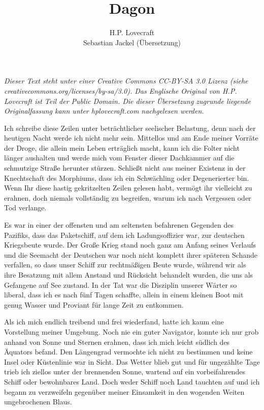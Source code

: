 \documentclass[a4paper]{memoir}
\begin{document}
\title{Dagon}
\author{H.P. Lovecraft\\
		Sebastian Jackel (Übersetzung)}
\date{}
\maketitle

\textit{Dieser Text steht unter einer Creative Commons CC-BY-SA 3.0 Lizenz
(siehe\\ creativecommons.org/licenses/by-sa/3.0). Das Englische Original von H.P. Lovecraft ist Teil der Public Domain. Die dieser Übersetzung zugrunde liegende Originalfassung kann unter hplovecraft.com nachgelesen werden.}

\vspace{12pt}

Ich schreibe diese Zeilen unter beträchtlicher seelischer Belastung, denn nach der heutigen Nacht werde ich nicht mehr sein. Mittellos und am Ende meiner Vorräte der Droge, die allein mein Leben erträglich macht, kann ich die Folter nicht länger aushalten und werde mich vom Fenster dieser Dachkammer auf die schmutzige Straße herunter stürzen. Schließt nicht aus meiner Existenz in der Knechtschaft des Morphiums, dass ich ein Schwächling oder Degenerierter bin. Wenn Ihr diese hastig gekritzelten Zeilen gelesen habt, vermögt ihr vielleicht zu erahnen, doch niemals vollständig zu begreifen, warum ich nach Vergessen oder Tod verlange.

Es war in einer der offensten und am seltensten befahrenen Gegenden des Pazifiks, dass das Paketschiff, auf dem ich Ladungsoffizier war, zur deutschen Kriegsbeute wurde. Der Große Krieg stand noch ganz am Anfang seines Verlaufs und die Seemacht der Deutschen war noch nicht komplett ihrer späteren Schande verfallen, so dass unser Schiff zur rechtmäßigen Beute wurde, während wir als ihre Besatzung mit allem Anstand und Rücksicht behandelt wurden, die uns als Gefangene auf See zustand. In der Tat war die Disziplin unserer Wärter so liberal, dass ich es nach fünf Tagen schaffte, allein in einem kleinen Boot mit genug Wasser und Proviant für lange Zeit zu entkommen.

Als ich mich endlich treibend und frei wiederfand, hatte ich kaum eine Vorstellung meiner Umgebung. Noch nie ein guter Navigator, konnte ich nur grob anhand von Sonne und Sternen erahnen, dass ich mich leicht südlich des Äquators befand. Den Längengrad vermochte ich nicht zu bestimmen und keine Insel oder Küstenlinie war in Sicht. Das Wetter blieb gut und für ungezählte Tage trieb ich ziellos unter der brennenden Sonne, wartend auf ein vorbeifahrendes Schiff oder bewohnbares Land. Doch weder Schiff noch Land tauchten auf und ich begann zu verzweifeln gegenüber meiner Einsamkeit in den wogenden Weiten ungebrochenen Blaus.
\end{document}
